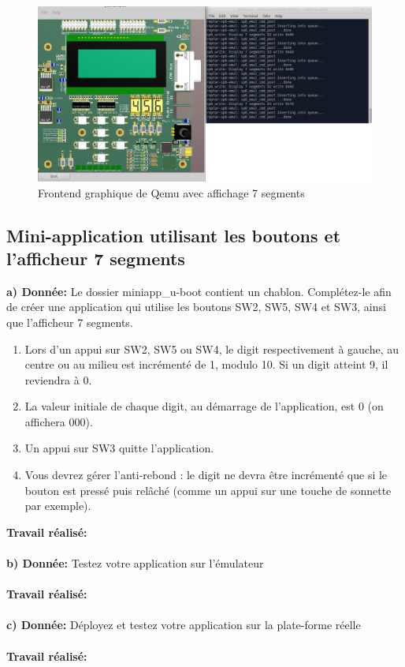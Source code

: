 \begin{figure}[H]
	\begin{center}
		\includegraphics[width=15cm]{img/emulation2.png}
		\caption{Frontend graphique de Qemu avec affichage 7 segments}
		\label{emulation2}
	\end{center}
\end{figure}
\subsection{Mini-application utilisant les boutons et l'afficheur 7 segments}
\textbf{a) Donnée: }Le dossier miniapp\_u-boot contient un chablon. Complétez-le afin de créer une application qui
utilise les boutons SW2, SW5, SW4 et SW3, ainsi que l’afficheur 7 segments.
\begin{enumerate}
	\item Lors d’un appui sur SW2, SW5 ou SW4, le digit respectivement à gauche, au centre ou au
	milieu est incrémenté de 1, modulo 10. Si un digit atteint 9, il reviendra à 0. 
	\item La valeur initiale de chaque digit, au démarrage de l’application, est 0 (on affichera 000). 
	\item Un appui sur SW3 quitte l’application. 
	\item Vous devrez gérer l’anti-rebond : le digit ne devra être incrémenté que si le bouton est
	pressé puis relâché (comme un appui sur une touche de sonnette par exemple). \\
\end{enumerate}
\textbf{Travail réalisé: }\\\\
\textbf{b) Donnée: }Testez votre application sur l’émulateur\\\\
\textbf{Travail réalisé: }\\\\
\textbf{c) Donnée: }Déployez et testez votre application sur la plate-forme réelle\\\\
\textbf{Travail réalisé: }\\\\


